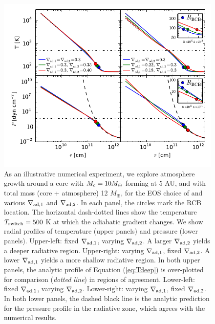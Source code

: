 \begin{figure}[H]
\centering
\includegraphics[width=\textwidth]{figures/varying_delad_4panel_3.pdf}
\caption{As an illustrative numerical experiment, we explore atmosphere growth around a core with $M_{\rm c}=10 M_{\oplus}$ forming at 5 AU, and with total mass (core + atmosphere) 12 $M_{\oplus}$, for the EOS choice of  and various $\nabla_{\rm ad,1}$ and $\nabla_{\rm ad,2}$. In each panel, the circles mark the RCB location. The horizontal dash-dotted lines show the temperature $T_{\rm switch}=500$ K at which the adiabatic gradient changes. We show radial profiles of temperature (upper panels) and pressure (lower panels). Upper-left: fixed $\nabla_{\rm ad,1}$, varying  $\nabla_{\rm ad,2}$. A larger $\nabla_{\rm ad,2}$ yields a deeper radiative region. Upper-right: varying $\nabla_{\rm ad,1}$, fixed $\nabla_{\rm ad,2}$. A lower $\nabla_{\rm ad,1}$ yields a more shallow radiative region. In both upper panels, the analytic profile of Equation (\ref{eq:Tdeep}) is over-plotted for comparison (\textit{dotted line}) in regions of agreement. Lower-left: fixed $\nabla_{\rm ad,1}$, varying  $\nabla_{\rm ad,2}$. Lower-right: varying $\nabla_{\rm ad,1}$, fixed $\nabla_{\rm ad,2}$. In both lower panels, the dashed black line is the analytic prediction for the pressure profile in the radiative zone, which agrees with the numerical results.}
\label{fig:varying_delad}
\end{figure}

